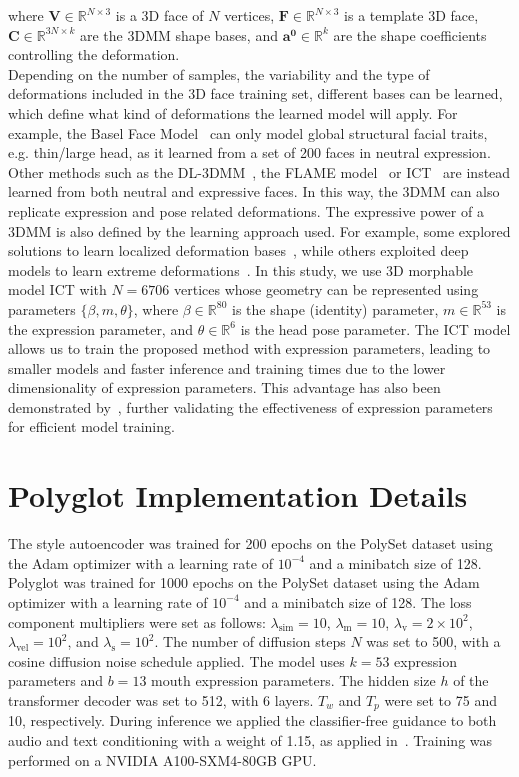 \documentclass[a4paper, 10pt, conference]{ieeeconf}      %
\begin{document}
\noindent
where $\mathbf{V}\in \mathbb{R}^{N \times 3}$ is a 3D face of $N$ vertices, $\mathbf{F}\in \mathbb{R}^{N \times 3}$ is a template 3D face, $\mathbf{C}\in \mathbb{R}^{3N \times k}$ are the 3DMM shape bases, and $\mathbf{a^0} \in \mathbb{R}^k$ are the shape coefficients controlling the deformation.\\
Depending on the number of samples, the variability and the type of deformations included in the 3D face training set, different bases can be learned, which define what kind of deformations the learned model will apply. For example, the Basel Face Model~\cite{paysan20093d} can only model global structural facial traits, e.g. thin/large head, as it learned from a set of 200 faces in neutral expression. Other methods such as the DL-3DMM~\cite{ferrari2015dictionary}, the FLAME model~\cite{li2017learning} or ICT~\cite{ict} are instead learned from both neutral and expressive faces. In this way, the 3DMM can also replicate expression and pose related deformations. The expressive power of a 3DMM is also defined by the learning approach used. For example, some explored solutions to learn localized deformation bases~\cite{ferrari2021sparse,neumann2013sparse,luthi2017gaussian}, while others exploited deep models to learn extreme deformations~\cite{bouritsas2019neural}. In this study, we use 3D morphable model ICT with $N = 6706$ vertices whose geometry can be represented using parameters $\{\beta,m,\theta\}$, where $\beta \in \mathbb{R}^{80}$ is the shape (identity) parameter, $m \in \mathbb{R}^{53}$ is the expression parameter, and $\theta \in \mathbb{R}^{6}$ is the head pose parameter. The ICT model allows us to train the proposed method with expression parameters, leading to smaller models and faster inference and training times due to the lower dimensionality of expression parameters. This advantage has also been demonstrated by~\cite{sun2023diffposetalk}, further validating the effectiveness of expression parameters for efficient model training.

\section{Polyglot Implementation Details}
The style autoencoder was trained for 200 epochs on the PolySet dataset using the Adam optimizer with a learning rate of \(10^{-4}\) and a minibatch size of 128.
Polyglot was trained for 1000 epochs on the PolySet dataset using the Adam optimizer with a learning rate of \(10^{-4}\) and a minibatch size of 128. The loss component multipliers were set as follows: \(\lambda_{\text{sim}} = 10\), \(\lambda_{\text{m}} = 10\), \(\lambda_{\text{v}} = 2 \times 10^2\), \(\lambda_{\text{vel}} = 10^2\), and \(\lambda_{\text{s}} = 10^2\). The number of diffusion steps \(N\) was set to 500, with a cosine diffusion noise schedule applied. The model uses \(k = 53\) expression parameters and \(b = 13\) mouth expression parameters. The hidden size \(h\) of the transformer decoder was set to 512, with 6 layers. \(T_w\) and \(T_p\) were set to 75 and 10, respectively. During inference we applied the classifier-free guidance to both audio and text conditioning with a weight of 1.15, as applied in~\cite{sun2023diffposetalk}. Training was performed on a NVIDIA A100-SXM4-80GB GPU.
\end{document}
